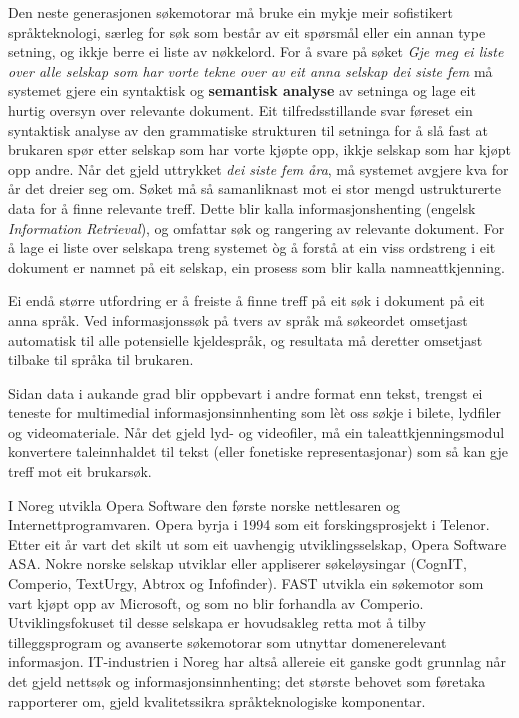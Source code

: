 \begin{multicols}{2}

Den neste generasjonen søkemotorar må bruke ein mykje meir sofistikert språkteknologi, særleg for søk som består av eit spørsmål eller ein annan type setning, og ikkje berre ei liste av nøkkelord. For å svare på søket \textit{Gje meg ei liste over alle selskap som har vorte tekne over av eit anna selskap dei siste fem} må systemet gjere ein syntaktisk og \textbf{semantisk analyse} av setninga og lage eit hurtig oversyn over relevante dokument. Eit tilfredsstillande svar føreset ein syntaktisk analyse av den grammatiske strukturen til setninga for å slå fast at brukaren spør etter selskap som har vorte kjøpte opp, ikkje selskap som har kjøpt opp andre. Når det gjeld uttrykket \textit{dei siste fem åra}, må systemet avgjere kva for år det dreier seg om. Søket må så samanliknast mot ei stor mengd ustrukturerte data for å finne relevante treff. Dette blir kalla informasjonshenting (engelsk \textit{Information Retrieval}), og omfattar søk og rangering av relevante dokument. For å lage ei liste over selskapa treng systemet òg å forstå at ein viss ordstreng i eit dokument er namnet på eit selskap, ein prosess som blir kalla namneattkjenning. 

Ei endå større utfordring er å freiste å finne treff på eit søk i dokument på eit anna språk. Ved informasjonssøk på tvers av språk må søkeordet omsetjast automatisk til alle potensielle kjeldespråk, og resultata må deretter omsetjast tilbake til språka til brukaren. 

Sidan data i aukande grad blir oppbevart i andre format enn tekst, trengst ei teneste for multimedial informasjonsinnhenting som lèt oss søkje i bilete, lydfiler og videomateriale. Når det gjeld lyd- og videofiler, må ein taleattkjenningsmodul konvertere taleinnhaldet til tekst (eller fonetiske representasjonar) som så kan gje treff mot eit brukarsøk. 

I Noreg utvikla Opera Software den første norske nettlesaren og Internettprogramvaren. Opera byrja i 1994 som eit forskingsprosjekt i Telenor. 
Etter eit år vart det skilt ut som eit uavhengig utviklingsselskap, Opera Software ASA. Nokre norske selskap utviklar eller appliserer søkeløysingar (CognIT, Comperio, TextUrgy, Abtrox og Infofinder). 
FAST utvikla ein søkemotor som vart kjøpt opp av Microsoft, og som no blir forhandla av Comperio. 
Utviklingsfokuset til desse selskapa er hovudsakleg retta mot å tilby tilleggsprogram og avanserte søkemotorar som utnyttar domenerelevant informasjon. 
IT-industrien i Noreg har altså allereie eit ganske godt grunnlag når det gjeld nettsøk og informasjonsinnhenting; det største behovet som føretaka rapporterer om, gjeld kvalitetssikra språkteknologiske komponentar.


\end{multicols}
